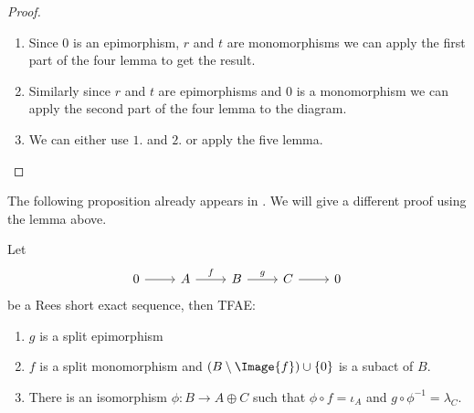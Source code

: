 \begin{proof}[Proof]
    \begin{enumerate}
        \item Since $0$ is an epimorphism, $r$ and $t$ are monomorphisms we can apply the first part of the four lemma 
        to get the result.
        \item Similarly since $r$ and $t$ are epimorphisms and $0$ is a monomorphism we can apply the second part of the four lemma to the diagram.
        \item We can either use $1.$ and $2.$ or apply the five lemma.
    \end{enumerate}
\end{proof}
The following proposition already appears in \cite{Chen02}. We will give a different proof using the lemma above.
\begin{proposition}
    Let 
    \[\begin{tikzcd}
        0 & A & B & C & 0
        \arrow[from=1-1, to=1-2]
        \arrow["f", from=1-2, to=1-3]
        \arrow["g", from=1-3, to=1-4]
        \arrow[from=1-4, to=1-5]
    \end{tikzcd}\]
    be a Rees short exact sequence, then TFAE:
    \begin{enumerate}
        \item $g$ is a split epimorphism
        \item $f$ is a split monomorphism and $(B\setminus\Image{f})\cup\{0\}$ is a subact of $B$.
        \item There is an isomorphism $\phi: B\to  A\oplus C$ such that $\phi\circ f=\iota_A$ and 
        $g\circ\phi^{-1}=\lambda_C$.
    \end{enumerate}
\end{proposition}
